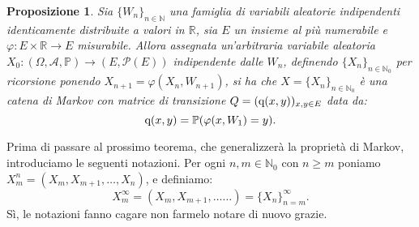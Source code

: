 \documentclass[11pt]{book}
\theoremstyle{Definizione}
\theoremstyle{TeoremaProposizioneLemmaCorollario}
\newtheorem{mypropo}[myteo]{Proposizione}
\theoremstyle{OsservazioneNota}
\newcommand{\R}{\mathbb{R}}
\newcommand{\N}{\mathbb{N}}
\renewcommand{\P}{\mathbb{P}}
\newcommand{\q}{\textup{q}}
\begin{document}
\begin{boxpro}
\begin{mypropo}
Sia $\{W_n\}_{n \in \N}$ una famiglia di variabili aleatorie indipendenti identicamente distribuite a valori in $\R$, sia $E$ un insieme al più numerabile e $\varphi:E \times \R \longrightarrow E$ misurabile. Allora assegnata un'arbitraria variabile aleatoria $X_0:(\Omega,\mathcal{A},\P) \longrightarrow (E,\mathcal{P}(E))$ indipendente dalle $W_n$, definendo $\{X_n\}_{n\in \N_0}$ per ricorsione ponendo $X_{n+1} = \varphi(X_n,W_{n+1})$, si ha che $X = \{X_n\}_{n\in \N_0}$ è una catena di Markov con matrice di transizione $Q = (\q(x,y))_{x,y\in E}$ data da:
$$
\q(x,y) = \P(\varphi(x,W_1) = y).
$$
\end{mypropo}
\end{boxpro}
\noindent
Prima di passare al prossimo teorema, che generalizzerà la proprietà di Markov, introduciamo le seguenti notazioni. Per ogni $n,m\in \N_0$ con $n\geq m$ poniamo $
X_{m}^{n} = (X_m,X_{m+1},\dots,X_n)$, e definiamo:
$$
X_m^{\infty} = (X_m,X_{m+1},\dots\dots) = \{X_n\}_{n = m}^\infty.
$$
Sì, le notazioni fanno cagare non farmelo notare di nuovo grazie.
\end{document}
